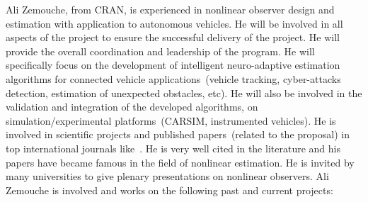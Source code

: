 \documentclass[a4paper,11pt]{article}
\begin{document}
Ali {Z\sc emouche}, from CRAN, is experienced in nonlinear observer design and estimation with application to autonomous vehicles. He will be involved in all aspects of the project to ensure the successful delivery of the project. He will provide the overall coordination and leadership of the program. He will specifically focus on the development of intelligent neuro-adaptive estimation algorithms for connected vehicle applications~(vehicle tracking, cyber-attacks detection, estimation of unexpected obstacles, etc). He will also be involved in the validation and integration of the developed algorithms, on simulation/experimental platforms~(CARSIM, instrumented vehicles).
He is involved in scientific projects and published papers~(related to the proposal) in top international journals like~\cite{Jeon8610212,Rajamani-7930581,Zemouche-8540946,ZEMOUCHE2017412}. He is very well cited in the literature and his papers have became famous in the field of nonlinear estimation. He is invited by many universities to give plenary presentations on nonlinear observers. Ali {Z\sc emouche} is involved and works on the following past and current projects:
\end{document}
